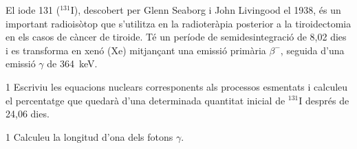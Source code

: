 El iode 131 ($^{131}$I), descobert per Glenn Seaborg i John Livingood el 1938, és un important radioisòtop que s'utilitza en la radioteràpia posterior a la tiroidectomia en els casos de càncer de tiroide. Té un període de semidesintegració de 8,02 dies i es transforma en xenó (Xe) mitjançant una emissió primària $\beta^-$, seguida d'una emissió $\gamma$ de 364~keV.

\begin{apartat}{1}
Escriviu les equacions nuclears corresponents als processos esmentats i calculeu el percentatge que quedarà d'una determinada quantitat inicial de $^{131}$I després de 24,06 dies.
\end{apartat}

\begin{apartat}{1}
Calculeu la longitud d'ona dels fotons $\gamma$.
\end{apartat}

